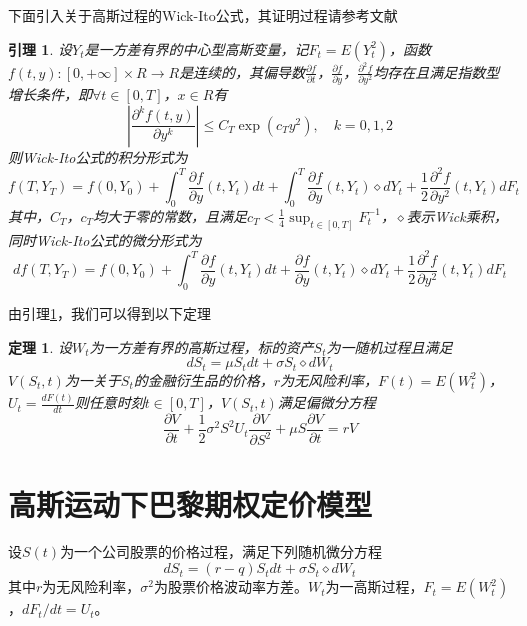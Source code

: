 \documentclass{ctexart} %
\newtheorem{theorem}[definition]{\hspace{2em}定理}
\newtheorem{lemma}[definition]{\hspace{2em}引理}
\begin{document}
下面引入关于高斯过程的Wick-Ito公式，其证明过程请参考文献\cite{ref16}
\begin{lemma}
\label{x1}
设$Y_t$是一方差有界的中心型高斯变量，记$F_t=E(Y^2_t)$，函数$f(t,y):[0,+\infty]\times R\rightarrow R$是连续的，其偏导数$\frac{\partial f}{\partial t}$，$\frac{\partial f}{\partial y}$，$\frac{\partial^2 f}{\partial y^2}$均存在且满足指数型增长条件，即$\forall t\in[0,T]$，$x \in R$有
\begin{equation}
|\frac{\partial^k f(t,y)}{\partial y^k}|\leq C_T\exp(c_Ty^2),\quad k=0,1,2
\end{equation}
则Wick-Ito公式的积分形式为
\begin{equation}
f(T,Y_T)=f(0,Y_0)+\int^T_0\frac{\partial f}{\partial y}(t,Y_t)dt+\int^T_0\frac{\partial f}{\partial y}(t,Y_t)\diamond dY_t+\frac{1}{2}\frac{\partial^2 f}{\partial y^2}(t,Y_t)dF_t
\end{equation}
其中，$C_T$，$c_T$均大于零的常数，且满足$c_T<\frac{1}{4}\sup_{t\in[0,T]}F_t^{-1}$，$\diamond$表示Wick乘积，同时Wick-Ito公式的微分形式为
\begin{equation}
df(T,Y_T)=f(0,Y_0)+\int^T_0\frac{\partial f}{\partial y}(t,Y_t)dt+\frac{\partial f}{\partial y}(t,Y_t)\diamond dY_t+\frac{1}{2}\frac{\partial^2 f}{\partial y^2}(t,Y_t)dF_t
\end{equation}
\end{lemma}

由引理\ref{x1}，我们可以得到以下定理\cite{ref16}
\begin{theorem}
设$W_t$为一方差有界的高斯过程，标的资产$S_t$为一随机过程且满足
\begin{equation}
dS_t=\mu S_tdt+\sigma S_t\diamond dW_t
\end{equation}
$V(S_t,t)$为一关于$S_t$的金融衍生品的价格，$r$为无风险利率，$F(t)=E(W^2_t)$，$U_t=\frac{dF(t)}{dt}$则任意时刻$t\in[0,T]$，$V(S_t,t)$满足偏微分方程
\begin{equation}
\label{f1}
\frac{\partial V}{\partial t}+\frac{1}{2}\sigma^2S^2U_t\frac{\partial V}{\partial S^2}+\mu S\frac{\partial V}{\partial t}=rV
\end{equation}


\end{theorem}


\section{高斯运动下巴黎期权定价模型}
设$S(t)$为一个公司股票的价格过程，满足下列随机微分方程
\begin{equation}
dS_t=(r-q)S_t dt+\sigma S_t \diamond dW_t
\end{equation}
其中$r$为无风险利率，$\sigma^2$为股票价格波动率方差。$W_t$为一高斯过程，$F_t=E(W^2_t)$，$dF_t/dt=U_t$。
\end{document}
